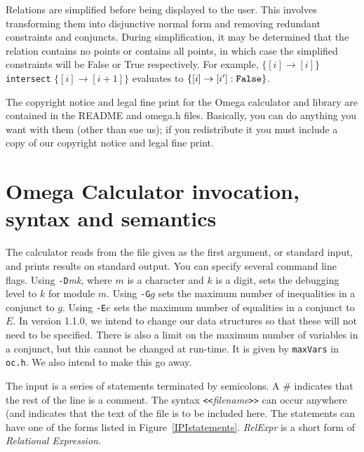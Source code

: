 Relations are simplified before being displayed to the user.  This
involves transforming them into disjunctive normal form and removing
redundant constraints and conjuncts.  During simplification, it may be determined
that the relation contains no points or contains all points, in which
case the simplified constraints will be False or True respectively.
For example, $\{[i]\rightarrow[i]\}$ {\tt intersect}
$\{[i]\rightarrow[i+1]\}$ evaluates to $\{[i]\rightarrow[i'] : {\tt
False}\}$.

The copyright notice and legal fine print for the Omega calculator and library are contained in
the README and omega.h files. Basically, you can do anything you want with
them (other than sue us); if you redistribute it
you must include a copy of our copyright notice and legal fine print.

\section{Omega Calculator invocation, syntax and semantics}

The calculator reads from the file given as the first argument, or
standard input, and prints results on standard output.  
You can specify several command line flags. Using {\tt -D}{\em mk},
where $m$ is a character and $k$ is a digit, sets the debugging level
to $k$ for module $m$. Using {\tt -G}$g$ sets the maximum number
of inequalities in a conjunct to $g$. Using {\tt -E}$e$ sets the maximum number
of equalities in a conjunct to $E$. In version 1.1.0, we intend to 
change our data structures so that these will not need to be specified.
There is also a limit on the maximum number of variables in a conjunct,
but this cannot be changed at run-time. It is given by
{\tt maxVars} in {\tt oc.h}. We also intend to make this go away.


The input is a
series of statements terminated by semicolons. A \# indicates that
the rest of the line is a comment.  
The syntax {\tt <<}{\em filename}{\tt >>} can occur anywhere
(and indicates that the text of the file is to be included here.
The statements can have one of the
forms listed in Figure~\ref{IPIstatements}.  {\em RelExpr} is a short
form of {\em Relational Expression}.

